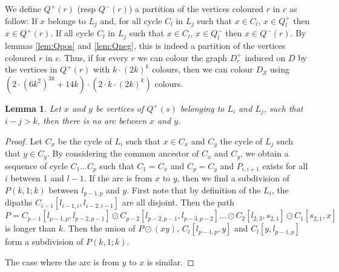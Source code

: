 \documentclass[utf8,10pt]{article}
\theoremstyle{plain}
\newtheorem{lemma}[theorem]{Lemma}
\theoremstyle{definition}
\theoremstyle{remark}
\newcommand{\dr}{ k \cdot (2k)^k}
\newcommand{\col}{(6k^2)^{3k}}
\begin{document}
%
We define $Q^+(r)$ (resp $Q^-(r)$) a partition of the vertices coloured $r$ in $c$ as follow:
If $x$ belongs to $L_j$ and, for all cycle $C_l$ in $L_j$ such that $x \in C_l$, $x \in Q^+_l$ then $x \in Q^+(r)$.
If all cycle $C_l$ in $L_j$ such that $x \in C_l$, $x \in Q^-_l$ then $x \in Q^-(r)$.
By lemmas \ref{lem:Qpos} and \ref{lem:Qneg}, this is indeed a partition of the vertices coloured $r$ in $c$.
Thus, if for every $r$ we can colour the graph $D_r^+$ induced on $D$ by the vertices in 
$Q^+(r)$ with $\dr$ colours, then we can colour $D_{\mathcal{S}}$ using 
$(2\cdot \col + 14k) \cdot (2 \cdot \dr)$ colours.  


\begin{lemma}\label{lem:lvl}
Let $x$ and $y$ be vertices of $Q^+(s)$ belonging to $L_i$ and $L_j$, such that $i-j> k$, then there is no arc between $x$ and $y$.
\end{lemma}

\begin{proof}
Let $C_x$ be the cycle of $L_i$ such that $x \in C_x$ and $C_y$ the cycle of $L_j$ such that $y \in C_y$.
By considering the common ancestor of $C_x$ and $C_y$, we obtain a sequence of cycle $C_1 \dots C_p$ such that $C_1 = C_x$ and $C_p = C_y$
and $P_{i,i+1}$ exists for all $i$ between 1 and $l-1$.
If the arc is from $x$ to $y$, then we find a subdivision of $P(k,1;k)$ between $l_{p-1,p}$ and $y$. 
First note that by definition of the $L_i$, the dipaths $C_{i-1}[l_{i-1,i}, l_{i-2,i-1}]$ are all disjoint. 
Then the path $P = C_{p-1}[l_{p-1,p}, l_{p-2,p-1}] \odot C_{p-2}[l_{p-2,p-1}, l_{p-3,p-2}] \dots \odot C_{2}[l_{2,3}, s_{2,1}] 
\odot C_1[s_{2,1}, x]$ is longer than $k$. Then the union of $P \odot (xy)$, $C_l[l_{p-1,p}, y]$ and $C_l[y,l_{p-1,p}]$ form a subdivision of $P(k,1;k)$.

The case where the arc is from $y$ to $x$ is similar.
\end{proof}
\end{document}
